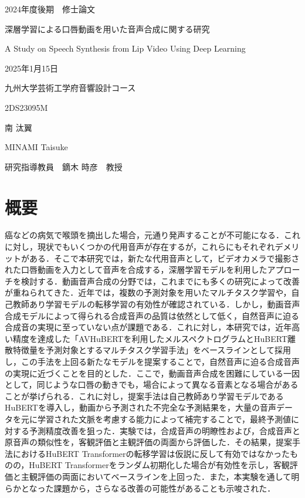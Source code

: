 \documentclass[12pt]{jarticle}
\numberwithin{equation}{section}    %
\numberwithin{figure}{section}      %
\numberwithin{table}{section}      %
\begin{document}
\begin{titlepage}
    \begin{center}
        {\Large 2024年度後期　修士論文}
        \vspace{120truept}

        {\huge 深層学習による口唇動画を用いた音声合成に関する研究}
        \vspace{30truept}

        {\huge A Study on Speech Synthesis from Lip Video Using Deep Learning}
        \vspace{120truept}

        {\Large 2025年1月15日}
        \vspace{10truept}

        {\Large 九州大学芸術工学府音響設計コース}
        \vspace{70truept}

        {\Large 2DS23095M}
        \vspace{10truept}

        {\Large 南 汰翼}
        \vspace{10truept}

        {\Large MINAMI Taisuke}
        \vspace{30truept}

        {\Large 研究指導教員　鏑木 時彦　教授}
    \end{center}
\end{titlepage}

\section*{概要}
\thispagestyle{empty}
癌などの病気で喉頭を摘出した場合，元通り発声することが不可能になる．これに対し，現状でもいくつかの代用音声が存在するが，これらにもそれぞれデメリットがある．そこで本研究では，新たな代用音声として，ビデオカメラで撮影された口唇動画を入力として音声を合成する，深層学習モデルを利用したアプローチを検討する．動画音声合成の分野では，これまでにも多くの研究によって改善が重ねられてきた．近年では，複数の予測対象を用いたマルチタスク学習や，自己教師あり学習モデルの転移学習の有効性が確認されている．しかし，動画音声合成モデルによって得られる合成音声の品質は依然として低く，自然音声に迫る合成音の実現に至っていない点が課題である．これに対し，本研究では，近年高い精度を達成した「AVHuBERTを利用したメルスペクトログラムとHuBERT離散特徴量を予測対象とするマルチタスク学習手法」をベースラインとして採用し，この手法を上回る新たなモデルを提案することで，自然音声に迫る合成音声の実現に近づくことを目的とした．ここで，動画音声合成を困難にしている一因として，同じような口唇の動きでも，場合によって異なる音素となる場合があることが挙げられる．これに対し，提案手法は自己教師あり学習モデルであるHuBERTを導入し，動画から予測された不完全な予測結果を，大量の音声データを元に学習された文脈を考慮する能力によって補完することで，最終予測値に対する予測精度改善を狙った．実験では，合成音声の明瞭性および，合成音声と原音声の類似性を，客観評価と主観評価の両面から評価した．その結果，提案手法におけるHuBERT Transformerの転移学習は仮説に反して有効ではなかったものの，HuBERT Transformerをランダム初期化した場合が有効性を示し，客観評価と主観評価の両面においてベースラインを上回った．また，本実験を通して明らかとなった課題から，さらなる改善の可能性があることも示唆された．
\end{document}
